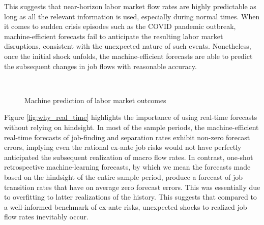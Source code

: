 This suggests that near-horizon labor market flow rates are highly predictable as long as all the relevant information is used, especially during normal times. When it comes to sudden crisis episodes such as the COVID pandemic outbreak, machine-efficient forecasts fail to anticipate the resulting labor market disruptions, consistent with the unexpected nature of such events. Nonetheless, once the initial shock unfolds, the machine-efficient forecasts are able to predict the subsequent changes in job flows with reasonable accuracy.
\begin{figure}[pt]
    \caption{Machine prediction of labor market outcomes}
    \label{fig:predictive_regression}
    \begin{center}
 \\
\vspace{0.4cm}
    \end{center}
\end{figure}

Figure \ref{fig:why_real_time} highlights the importance of using real-time forecasts without relying on hindsight. In most of the sample periods, the machine-efficient real-time forecasts of job-finding and separation rates exhibit non-zero forecast errors, implying even the rational ex-ante job risks would not have perfectly anticipated the subsequent realization of macro flow rates. In contrast, one-shot retrospective machine-learning forecasts, by which we mean the forecasts made based on the hindsight of the entire sample period, produce a forecast of job transition rates that have on average zero forecast errors. This was essentially due to overfitting to latter realizations of the history. This suggests that compared to a well-informed benchmark of ex-ante risks, unexpected shocks to realized job flow rates inevitably occur. 

